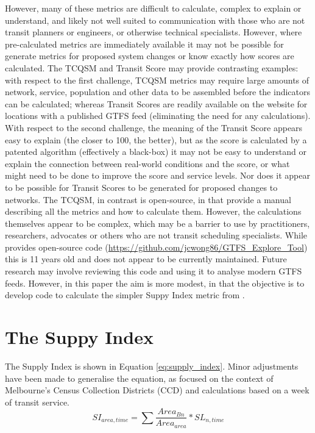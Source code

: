 \documentclass[]{tufte-book}
\begin{document}
However, many of these metrics are difficult to calculate, complex to
explain or understand, and likely not well suited to communication with
those who are not transit planners or engineers, or otherwise technical
specialists. However, where pre-calculated metrics are immediately
available it may not be possible for generate metrics for proposed
system changes or know exactly how scores are calculated. The TCQSM and
Transit Score may provide contrasting examples: with respect to the
first challenge, TCQSM metrics may require large amounts of network,
service, population and other data to be assembled before the indicators
can be calculated; whereas Transit Scores are readily available on the
\citet{WalkScore:2023tg} website for locations with a published GTFS
feed (eliminating the need for any calculations). With respect to the
second challenge, the meaning of the Transit Score appears easy to
explain (the closer to 100, the better), but as the score is calculated
by a patented algorithm (effectively a black-box) it may not be easy to
understand or explain the connection between real-world conditions and
the score, or what might need to be done to improve the score and
service levels. Nor does it appear to be possible for Transit Scores to
be generated for proposed changes to networks. The TCQSM, in contrast is
open-source, in that \citet{TCQSM:2013} provide a manual describing all
the metrics and how to calculate them. However, the calculations
themselves appear to be complex, which may be a barrier to use by
practitioners, researchers, advocates or others who are not transit
scheduling specialists. While \citet{Wong:2013aa} provides open-source
code (\url{https://github.com/jcwong86/GTFS_Explore_Tool}) this is 11
years old and does not appear to be currently maintained. Future
research may involve reviewing this code and using it to analyse modern
GTFS feeds. However, in this paper the aim is more modest, in that the
objective is to develop code to calculate the simpler Suppy Index metric
from \citet{currie2007identifying}.

\hypertarget{the-suppy-index}{%
\section{The Suppy Index}\label{the-suppy-index}}

The Supply Index is shown in Equation \ref{eq:supply_index}. Minor
adjustments have been made to generalise the equation, as
\citet{currie2007identifying} focused on the context of Melbourne's
Census Collection Districts (CCD) and calculations based on a week of
transit service. \begin{equation}
\label{eq:supply_index}
  SI_{area, time} = \sum{\frac{Area_{Bn}}{Area_{area}}*SL_{n, time}}
\end{equation}
\end{document}
